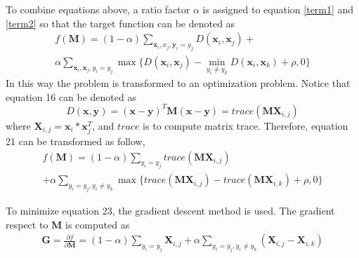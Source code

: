  
 To combine equations above, a ratio factor $\alpha$ is assigned to equation \eqref{term1} and \eqref{term2} so that the target function can be denoted as 
  \begin{equation}
  \begin{aligned}
 f(\bm{M}) = (1-\alpha)\sum_{\bm{x}_i,x_j,\bm{y}_i=y_j} D(\bm{x}_i,\bm{x}_j) + \\
  \alpha \sum_{\bm{x}_i,\bm{x}_j,y_i=y_j}\max\{{D(\bm{x}_i,\bm{x}_j)-\min_{y_i\ne y_k}{D(\bm{x}_i,\bm{x}_k)}+\rho,0}\}
 \end{aligned}
 \end{equation}
 In this way the problem is transformed to an optimization problem. Notice that equation 16 can be denoted as 
 \begin{equation}
 D(\bm{x},\bm{y}) = (\bm{x} - \bm{y})^T\bm{M}(\bm{x} - \bm{y}) = trace(\bm{M}\bm{X}_{i,j})
 \end{equation}
 where $\bm{X}_{i,j} = \bm{x}_i*\bm{x}_j^T$, and $trace$ is to compute matrix trace. Therefore, equation 21 can be transformed as follow,
 \begin{equation}
 \begin{aligned}
 f(\bm{M}) = (1-\alpha)\sum_{y_i = y_j}trace(\bm{M}\bm{X}_{i,j}) \\
  + \alpha \sum_{y_i = y_j,y_i\ne y_k}\max\{trace(\bm{M}\bm{X}_{i,j}) - trace(\bm{M}\bm{X}_{i,k} )+ \rho,0\}
 \end{aligned}
 \end{equation}
 
 To minimize equation 23, the gradient descent method is used. The gradient respect to $\bm{M}$ is computed as
 \begin{equation}
 \begin{aligned}
\bm{G} =  \frac{\partial f}{\partial \bm{M}} = (1-\alpha) \sum_{y_i = y_j} \bm{X}_{i,j} 
 + \alpha \sum_{y_i = y_j, y_i \ne y_k}(\bm{X}_{i,j} - \bm{X}_{i,k})
 \end{aligned}
 \end{equation}
 
